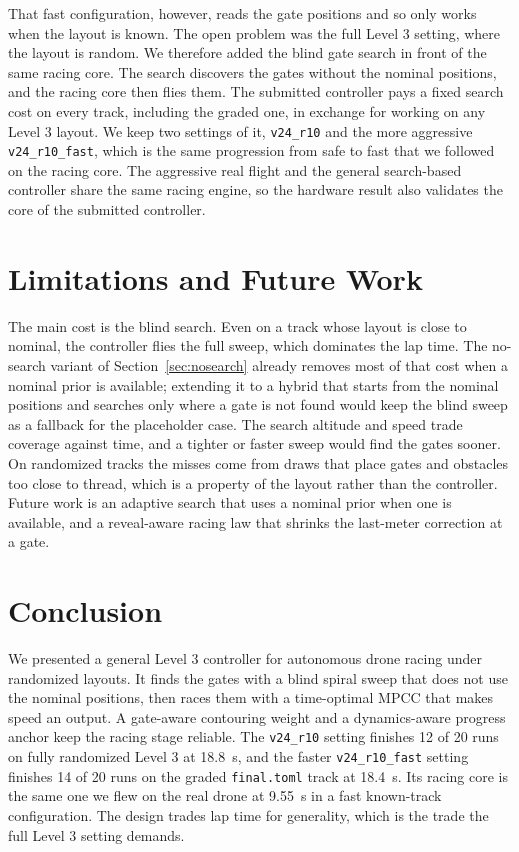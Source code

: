 \documentclass[conference]{IEEEtran}
\begin{document}
That fast configuration, however, reads the gate positions and so only works when the layout is known. The open problem was the full Level 3 setting, where the layout is random. We therefore added the blind gate search in front of the same racing core. The search discovers the gates without the nominal positions, and the racing core then flies them. The submitted controller pays a fixed search cost on every track, including the graded one, in exchange for working on any Level 3 layout. We keep two settings of it, \texttt{v24\_r10} and the more aggressive \texttt{v24\_r10\_fast}, which is the same progression from safe to fast that we followed on the racing core. The aggressive real flight and the general search-based controller share the same racing engine, so the hardware result also validates the core of the submitted controller.

\section{Limitations and Future Work}
\label{sec:limits}
The main cost is the blind search. Even on a track whose layout is close to nominal, the controller flies the full sweep, which dominates the lap time. The no-search variant of Section~\ref{sec:nosearch} already removes most of that cost when a nominal prior is available; extending it to a hybrid that starts from the nominal positions and searches only where a gate is not found would keep the blind sweep as a fallback for the placeholder case. The search altitude and speed trade coverage against time, and a tighter or faster sweep would find the gates sooner. On randomized tracks the misses come from draws that place gates and obstacles too close to thread, which is a property of the layout rather than the controller. Future work is an adaptive search that uses a nominal prior when one is available, and a reveal-aware racing law that shrinks the last-meter correction at a gate.

\section{Conclusion}
We presented a general Level 3 controller for autonomous drone racing under randomized layouts. It finds the gates with a blind spiral sweep that does not use the nominal positions, then races them with a time-optimal MPCC that makes speed an output. A gate-aware contouring weight and a dynamics-aware progress anchor keep the racing stage reliable. The \texttt{v24\_r10} setting finishes 12 of 20 runs on fully randomized Level 3 at 18.8~s, and the faster \texttt{v24\_r10\_fast} setting finishes 14 of 20 runs on the graded \texttt{final.toml} track at 18.4~s. Its racing core is the same one we flew on the real drone at 9.55~s in a fast known-track configuration. The design trades lap time for generality, which is the trade the full Level 3 setting demands.
\end{document}
